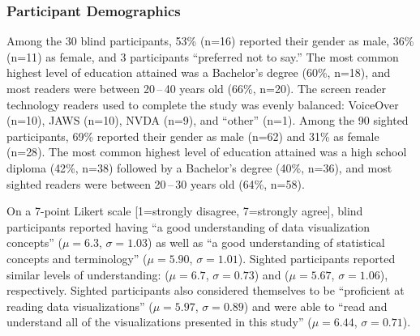\subsubsection{Participant Demographics}
Among the {30} blind participants, {53}\% (n={16}) reported their gender as male, {36}\% (n={11}) as female, and {3} participants ``preferred not to say.''
The most common highest level of education attained was a Bachelor's degree ({60}\%, n=18), and most readers were between 20\,--\,40 years old ({66}\%, n=20).
The screen reader technology readers used to complete the study was evenly balanced: VoiceOver (n=10), \ac{JAWS} (n=10), \ac{NVDA} (n=9), and ``other'' (n=1).
Among the {90} sighted participants, {69}\% reported their gender as male (n={62}) and {31}\% as female (n={28}).
The most common highest level of education attained was a high school diploma ({42}\%, n=38) followed by a Bachelor's degree ({40}\%, n=36), and most sighted readers were between 20\,--\,30 years old ({64}\%, n=58).

On a 7-point Likert scale [1=strongly disagree, 7=strongly agree], blind participants reported having ``a good understanding of data visualization concepts'' ($\mu=6.3$, $\sigma=1.03$) as well as ``a good understanding of statistical concepts and terminology'' ($\mu=5.90$, $\sigma=1.01$). Sighted participants reported similar levels of understanding: ($\mu=6.7$, $\sigma=0.73$) and ($\mu=5.67$, $\sigma=1.06$), respectively.
Sighted participants also considered themselves to be ``proficient at reading data visualizations'' ($\mu=5.97$, $\sigma=0.89$) and were able to ``read and understand all of the visualizations presented in this study'' ($\mu=6.44$, $\sigma=0.71$).





